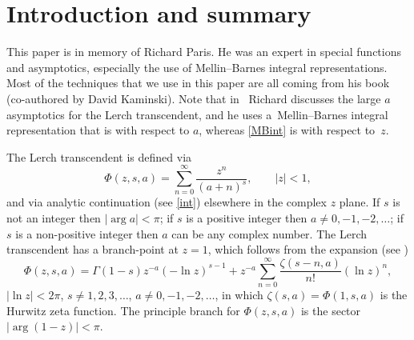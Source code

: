 \documentclass[11pt]{article}
\numberwithin{equation}{section}
\numberwithin{equation}{section}
\begin{document}
\section{Introduction and summary}
This paper is in memory of Richard Paris. He was an expert in special functions and
asymptotics, especially the use of Mellin--Barnes integral representations.
Most of the techniques that we use in this paper are all coming from his
book \cite{Paris2001} (co-authored by David Kaminski). Note that in~\cite{paris2016stokes} Richard
discusses the large $a$ asymptotics for the Lerch transcendent, and he uses a~Mellin--Barnes
integral representation that is with respect to $a$, whereas \eqref{MBint} is with respect to~$z$.

The Lerch transcendent is defined via
\begin{equation}\label{Phi}
 \Phi(z,s,a)=\sum_{n=0}^{\infty}\frac{z^{n}}{(a+n)^{s}},
 \qquad |z|<1,
\end{equation}
and via analytic continuation (see \eqref{int}) elsewhere in the complex $z$ plane.
If $s$ is not an integer then $|\arg a|<\pi$; if $s$ is a positive integer then
$a\not= 0,-1,-2,\ldots$; if $s$ is a non-positive integer then $a$ can be any complex number.
The Lerch transcendent has a branch-point at $z=1$, which follows from the expansion
(see \cite[Section~1.11\,(8)]{Erdelyi:1953:HTF1})
\begin{equation*}%
 \Phi(z,s,a)=\Gamma(1-s) z^{-a} (-\ln z)^{s-1}+z^{-a}
 \sum_{n=0}^{\infty}\frac{\zeta(s-n,a)}{n!}(\ln z)^n,
\end{equation*}
$|\ln z|<2\pi$, $s\not=1,2,3,\ldots$, $a\not=0,-1,-2,\ldots$, in which
$\zeta(s,a)=\Phi(1,s,a)$ is the Hurwitz zeta function.
The principle branch for $\Phi(z,s,a)$ is the sector $|\arg (1-z)|<\pi$.
\end{document}
